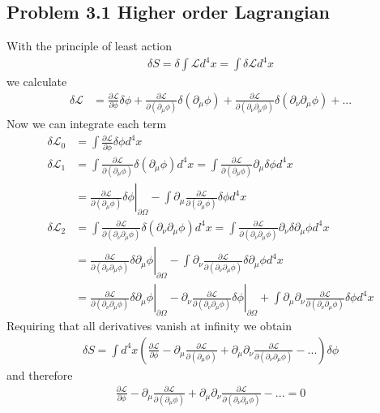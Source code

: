 \documentclass[../main.tex]{subfiles}
\begin{document}
\subsection{Problem 3.1 Higher order Lagrangian}
With the principle of least action
\begin{align}
\delta S=\delta\int\mathcal{L}d^4x=\int\delta\mathcal{L}d^4x
\end{align}
we calculate
\begin{align}
\delta\mathcal{L}
&=\frac{\partial \mathcal{L}}{\partial\phi}\delta\phi+
\frac{\partial \mathcal{L}}{\partial(\partial_\mu\phi)}\delta(\partial_\mu\phi)+
\frac{\partial \mathcal{L}}{\partial(\partial_\nu\partial_\mu\phi)}\delta(\partial_\nu\partial_\mu\phi)+...
\end{align}
Now we can integrate each term
\begin{align}
\delta\mathcal{L}_0&=\int \frac{\partial \mathcal{L}}{\partial\phi}\delta\phi d^4x\\
%
\delta\mathcal{L}_1&=\int \frac{\partial \mathcal{L}}{\partial(\partial_\mu\phi)}\delta(\partial_\mu\phi) d^4x
=\int \frac{\partial \mathcal{L}}{\partial(\partial_\mu\phi)}\partial_\mu\delta\phi d^4x\\
&=\left.\frac{\partial \mathcal{L}}{\partial(\partial_\mu\phi)}\delta\phi\right|_{\partial\Omega}-\int \partial_\mu\frac{\partial \mathcal{L}}{\partial(\partial_\mu\phi)}\delta\phi d^4x\\
%
\delta\mathcal{L}_2&=\int \frac{\partial \mathcal{L}}{\partial(\partial_\nu\partial_\mu\phi)}\delta(\partial_\nu\partial_\mu\phi) d^4x
=\int \frac{\partial \mathcal{L}}{\partial(\partial_\nu\partial_\mu\phi)}\partial_\nu\delta\partial_\mu\phi d^4x\\
&=\left.\frac{\partial \mathcal{L}}{\partial(\partial_\nu\partial_\mu\phi)}\delta\partial_\mu\phi\right|_{\partial\Omega}-\int \partial_\nu\frac{\partial \mathcal{L}}{\partial(\partial_\nu\partial_\mu\phi)}\delta\partial_\mu\phi d^4x\\
&=\left.\frac{\partial \mathcal{L}}{\partial(\partial_\nu\partial_\mu\phi)}\delta\partial_\mu\phi\right|_{\partial\Omega}-\left.\partial_\nu\frac{\partial \mathcal{L}}{\partial(\partial_\nu\partial_\mu\phi)}\delta\phi\right|_{\partial\Omega}+\int \partial_\mu\partial_\nu\frac{\partial \mathcal{L}}{\partial(\partial_\nu\partial_\mu\phi)}\delta\phi d^4x
\end{align}
Requiring that all derivatives vanish at infinity we obtain
\begin{align}
\delta S=\int d^4x\left(
\frac{\partial \mathcal{L}}{\partial\phi}
- \partial_\mu\frac{\partial \mathcal{L}}{\partial(\partial_\mu\phi)}
+\partial_\mu\partial_\nu\frac{\partial \mathcal{L}}{\partial(\partial_\nu\partial_\mu\phi)}-...
\right)\delta\phi
\end{align}
and therefore
\begin{align}
\frac{\partial \mathcal{L}}{\partial\phi}
- \partial_\mu\frac{\partial \mathcal{L}}{\partial(\partial_\mu\phi)}
+\partial_\mu\partial_\nu\frac{\partial \mathcal{L}}{\partial(\partial_\nu\partial_\mu\phi)}-...=0
\end{align}
\end{document}
